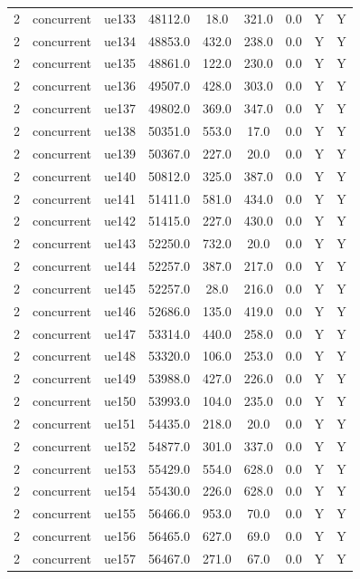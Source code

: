 \begin{table}[ht]
\begin{tabular}{|c|c|c|c|c|c|c|c|c|}
2 & concurrent & ue133 & 48112.0 & 18.0 & 321.0 & 0.0 & Y & Y \\
2 & concurrent & ue134 & 48853.0 & 432.0 & 238.0 & 0.0 & Y & Y \\
2 & concurrent & ue135 & 48861.0 & 122.0 & 230.0 & 0.0 & Y & Y \\
2 & concurrent & ue136 & 49507.0 & 428.0 & 303.0 & 0.0 & Y & Y \\
2 & concurrent & ue137 & 49802.0 & 369.0 & 347.0 & 0.0 & Y & Y \\
2 & concurrent & ue138 & 50351.0 & 553.0 & 17.0 & 0.0 & Y & Y \\
2 & concurrent & ue139 & 50367.0 & 227.0 & 20.0 & 0.0 & Y & Y \\
2 & concurrent & ue140 & 50812.0 & 325.0 & 387.0 & 0.0 & Y & Y \\
2 & concurrent & ue141 & 51411.0 & 581.0 & 434.0 & 0.0 & Y & Y \\
2 & concurrent & ue142 & 51415.0 & 227.0 & 430.0 & 0.0 & Y & Y \\
2 & concurrent & ue143 & 52250.0 & 732.0 & 20.0 & 0.0 & Y & Y \\
2 & concurrent & ue144 & 52257.0 & 387.0 & 217.0 & 0.0 & Y & Y \\
2 & concurrent & ue145 & 52257.0 & 28.0 & 216.0 & 0.0 & Y & Y \\
2 & concurrent & ue146 & 52686.0 & 135.0 & 419.0 & 0.0 & Y & Y \\
2 & concurrent & ue147 & 53314.0 & 440.0 & 258.0 & 0.0 & Y & Y \\
2 & concurrent & ue148 & 53320.0 & 106.0 & 253.0 & 0.0 & Y & Y \\
2 & concurrent & ue149 & 53988.0 & 427.0 & 226.0 & 0.0 & Y & Y \\
2 & concurrent & ue150 & 53993.0 & 104.0 & 235.0 & 0.0 & Y & Y \\
2 & concurrent & ue151 & 54435.0 & 218.0 & 20.0 & 0.0 & Y & Y \\
2 & concurrent & ue152 & 54877.0 & 301.0 & 337.0 & 0.0 & Y & Y \\
2 & concurrent & ue153 & 55429.0 & 554.0 & 628.0 & 0.0 & Y & Y \\
2 & concurrent & ue154 & 55430.0 & 226.0 & 628.0 & 0.0 & Y & Y \\
2 & concurrent & ue155 & 56466.0 & 953.0 & 70.0 & 0.0 & Y & Y \\
2 & concurrent & ue156 & 56465.0 & 627.0 & 69.0 & 0.0 & Y & Y \\
2 & concurrent & ue157 & 56467.0 & 271.0 & 67.0 & 0.0 & Y & Y \\

\end{tabular}
\end{table}
